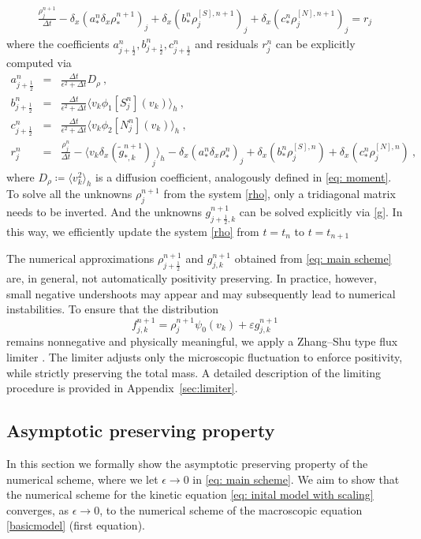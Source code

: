 \documentclass[11pt,twoside]{article}
\theoremstyle{nonumberplain}
\newcommand{\GER}{\color{myblue}}
\begin{document}
{\begin{eqnarray}\label{rho}
  \frac{\rho_j^{n+1}}{\Delta t}-\delta_x(a_*^n\delta_x\rho_*^{n+1})_j  +\delta_x(b_*^n\rho^{[S],n+1}_{j})_j 
  +\delta_x(c_*^n\rho^{[N],n+1}_{j})_j
  =r_j 
\end{eqnarray}
where the coefficients $a_{j+\frac{1}{2}}^n, b_{j+\frac{1}{2}}^n, c_{j+\frac{1}{2}}^n$ and residuals $r_j^n$ can be explicitly computed via
\begin{eqnarray*}
    a_{j+\frac{1}{2}}^n&=&\frac{\Delta t}{\epsilon^2+\Delta t} D_\rho\ ,\nonumber\\
    b_{j+\frac{1}{2}}^n&=&\frac{\Delta t}{\epsilon^2+\Delta t} \langle v_k\phi_1[S_{j}^n](v_k)\rangle_h\ ,\nonumber\\
    c_{j+\frac{1}{2}}^n&=&\frac{\Delta t}{\epsilon^2+\Delta t} \langle v_k\phi_2[N_{j}^n](v_k)\rangle_h\ ,\nonumber\\
    r_j^n&=&\frac{{\rho_j^{n}}}{\Delta t}-\langle v_k\delta_x(\tilde{g}_{*,k}^{n+1})_j\rangle_h
    -\delta_x(a_*^n\delta_x\rho_*^n)_j
    +\delta_x(b_*^n\rho^{[S],n}_{j})
    +\delta_x(c_*^n\rho^{[N],n}_{j})\ ,
    \end{eqnarray*}
    where $D_\rho\coloneqq\langle v_k^2\rangle_h$ is a diffusion coefficient, analogously defined in \eqref{eq: moment}. 
To solve all the unknowns $\rho_j^{n+1}$ from the system \eqref{rho}, only a tridiagonal matrix needs to be inverted. And the unknowns 
 $g_{j+\frac{1}{2},k}^{n+1}$ can be solved explicitly via \eqref{g}. In this way, we efficiently update the system \eqref{rho} from $t=t_n$ to $t=t_{n+1}$}


{
The numerical approximations $\rho_{j+\frac12}^{n+1}$ and $g_{j,k}^{n+1}$ obtained from \eqref{eq: main scheme} are, in general, not automatically positivity preserving.
In practice, however, small negative undershoots may appear and may subsequently lead to numerical instabilities.
To ensure that the distribution
$$
f_{j,k}^{n+1} = \rho_j^{n+1} \psi_0(v_k) + \varepsilon g_{j,k}^{n+1}
$$
remains nonnegative and physically meaningful, we apply a {\GER Zhang–Shu type flux limiter \cite{ZS-limiter}}.
The limiter adjusts only the microscopic fluctuation to enforce positivity, while strictly preserving the total mass. 
A detailed description of the limiting procedure is provided in Appendix~\ref{sec:limiter}.
}

\subsection{Asymptotic preserving property}
In this section we formally show the asymptotic preserving property of the numerical scheme, where we let $\epsilon\to 0$ in \eqref{eq: main scheme}. We aim to show that the numerical scheme for the kinetic equation \eqref{eq: inital model with scaling} converges, as $\epsilon\to 0$, to the numerical scheme of the macroscopic equation \eqref{basicmodel} (first equation).
\end{document}
